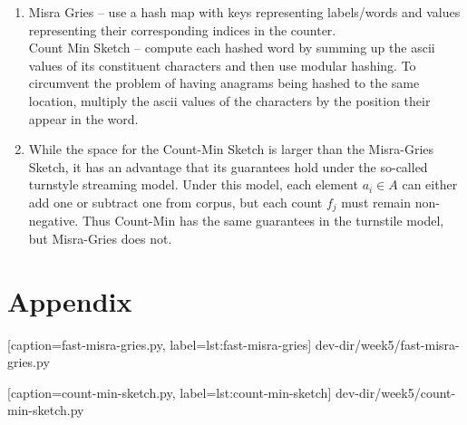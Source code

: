 \documentclass{article}
\begin{document}
\begin{enumerate}[leftmargin={*}, font={\bf}, label={\arabic*.}, ref={\arabic*}]
\begin{enumerate}[label={(\Alph*)}, ref={\theenumi(\Alph*)}]
        Likewise, for stream {\sf S2} we want to enforce $\hat{f}_q \geq 1/4 \times
        4,000,000 = 1,000,000$ for items that ``might'' occur at least 25\% of the time.
        From \autoref{tbl:count-min-sketch-s2}, the only item satisfying this constraint
        is item {\sf ``a''}. \\

        {\bf\sffamily --- Elements that ``must'' occur at least 25\% of the time} \par
        
        Elements of {\sf S1} that are guaranteed to occur at least 25\% of the time
        must satisfy the following constraint:
        \[
          \hat{f}_q > f_q + \varepsilon F_1
        \]
        Choose $\varepsilon = 2/k = 1/6$ to obtain for stream {\sf S1} that $\hat{f}_q
        > 1,250,000$. Inspecting the values from \autoref{tbl:count-min-sketch-s1},
        item {\sf ``a''} is the only item satisfying this constraint. \\
        
        Analagously, for the same fixed choice of $\varepsilon = 1/6$, in stream {\sf
        S2} we obtain $\hat{f}_q > 1,666,666.6\bar{6}$. Item {\sf ``a''} is the only
        item satisfying this constraint with an estimated frequency of $2,000,100$.
        
      \item \label{qst:1C}
        {\sf Misra Gries} -- use a hash map with keys representing labels/words and
        values representing their corresponding indices in the counter. \\

        {\sf Count Min Sketch} -- compute each hashed word by summing up the {\sf ascii}
        values of its constituent characters and then use modular hashing. To circumvent
        the problem of having anagrams being hashed to the same location, multiply the
        {\sf ascii} values of the characters by the position their appear in the word.

      \item \label{qst:1D}
        While the space for the {\sf Count-Min Sketch} is larger than the {\sf Misra-Gries
        Sketch}, it has an advantage that its guarantees hold under the so-called turnstyle
        streaming model. Under this model, each element $a_i \in A$ can either add one or
        subtract one from corpus, but each count $f_j$ must remain non-negative. Thus {\sf 
        Count-Min} has the same guarantees in the turnstile model, but {\sf Misra-Gries}
        does not.
    \end{enumerate}
\end{enumerate}

\newpage

\section*{Appendix}


  [caption={\sf fast-misra-gries.py}, label={lst:fast-misra-gries}]
  {dev-dir/week5/fast-misra-gries.py}
  
\newpage


  [caption={\sf count-min-sketch.py}, label={lst:count-min-sketch}]
  {dev-dir/week5/count-min-sketch.py}
\end{document}
